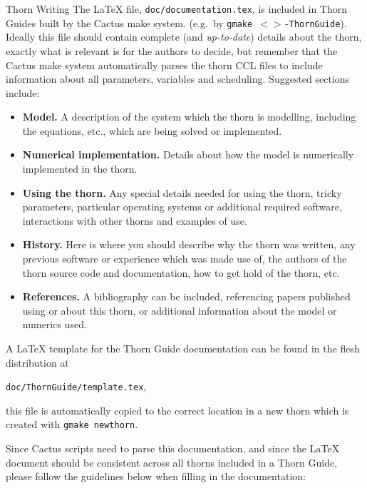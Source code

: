 \begin{cactuspart}{Thorn Writing}
The LaTeX file, \texttt{doc/documentation.tex}, is included in Thorn Guides
built by the Cactus make system. (e.g.\ by \texttt{gmake
$<$$>$-ThornGuide}). Ideally this file should contain complete
(and \textit{up-to-date}) details about the thorn, exactly what is
relevant is for the authors to decide, but remember that the Cactus
make system automatically parses the thorn CCL files to include
information about all parameters, variables and scheduling. Suggested
sections include:

\begin{itemize}

  \item{\bf Model.} A description of the system which the thorn is modelling,
    including the equations, etc., which are being solved or implemented.

  \item{\bf Numerical implementation.} Details about how the model is
    numerically implemented in the thorn.

  \item{\bf Using the thorn.} Any special details needed for using the
    thorn, tricky parameters, particular operating systems or additional
    required software, interactions with other thorns and examples of use.

  \item{\bf History.} Here is where you should describe why the thorn
    was written, any previous software or experience which was made use of,
    the authors of the thorn source code and documentation, how to get
    hold of the thorn, etc.

  \item{\bf References.} A bibliography can be included, referencing papers
    published using or about this thorn, or additional information about
    the model or numerics used.

\end{itemize}

A LaTeX template for the Thorn Guide documentation can be found in the
flesh distribution at

\texttt{doc/ThornGuide/template.tex},

this file is automatically copied to the correct location in a new thorn
which is created with \texttt{gmake newthorn}.

Since Cactus scripts need to parse this documentation, and since the
LaTeX document should be consistent across all thorns included in a
Thorn Guide, please follow the guidelines below when filling in the
documentation:


\end{cactuspart}
